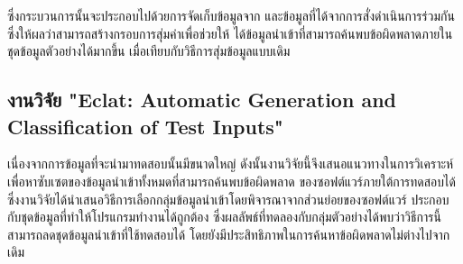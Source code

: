 ซึ่งกระบวนการนั้นจะประกอบไปด้วยการจัดเก็บข้อมูลจาก{\sourcecode} และข้อมูลที่ได้จากการสั่งดำเนินการร่วมกัน ซึ่งให้ผลว่าสามารถสร้างกรอบการสุ่มค่าเพื่อช่วยให้
ได้ข้อมูลนำเข้าที่สามารถค้นพบข้อผิดพลาดภายในชุดข้อมูลตัวอย่างได้มากขึ้น เมื่อเทียบกับวิธีการสุ่มข้อมูลแบบเดิม

\subsection{งานวิจัย "Eclat: Automatic Generation and Classification of Test Inputs" \cite{Heaton2000}}

เนื่องจากการข้อมูลที่จะนำมาทดสอบนั้นมีขนาดใหญ่ ดังนั้นงานวิจัยนี้จึงเสนอแนวทางในการวิเคราะห์เพื่อหาซับเซตของข้อมูลนำเข้าทั้งหมดที่สามารถค้นพบข้อผิดพลาด
ของซอฟต์แวร์ภายใต้การทดสอบได้ ซึ่งงานวิจัยได้นำเสนอวิธีการเลือกกลุ่มข้อมูลนำเข้าโดยพิจารณาจากส่วนย่อยของซอฟต์แวร์ 
ประกอบกับชุดข้อมูลที่ทำให้โปรแกรมทำงานได้ถูกต้อง ซึ่งผลลัพธ์ที่ทดลองกับกลุ่มตัวอย่างได้พบว่าวิธีการนี้สามารถลดชุดข้อมูลนำเข้าที่ใช้ทดสอบได้
โดยยังมีประสิทธิภาพในการค้นหาข้อผิดพลาดไม่ต่างไปจากเดิม

